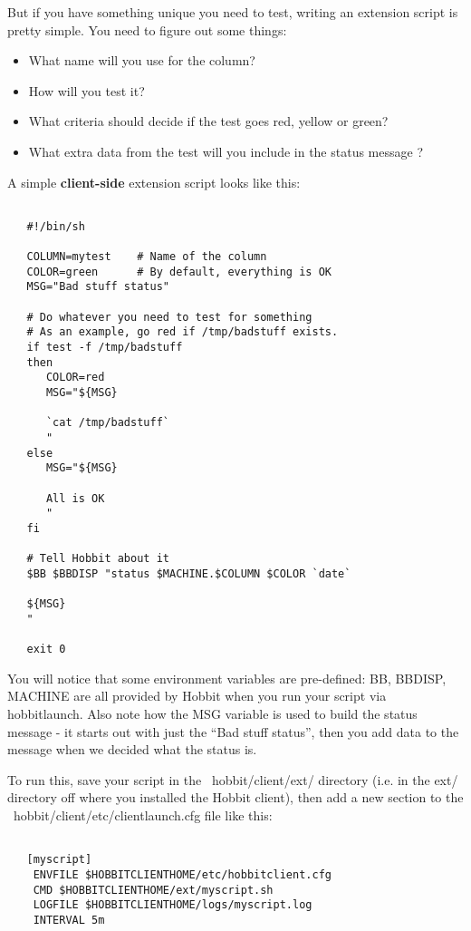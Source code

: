  But if you have something unique you need to test, writing an extension script is pretty simple. You need to figure out some things:
\begin{itemize}
\item What name will you use for the column? 
\item How will you test it? 
\item What criteria should decide if the test goes red, yellow or green? 
\item What extra data from the test will you include in the status message ? 

\end{itemize}


 A simple \textbf{client-side}
 extension script looks like this:
\begin{verbatim}

   #!/bin/sh

   COLUMN=mytest	# Name of the column
   COLOR=green		# By default, everything is OK
   MSG="Bad stuff status"

   # Do whatever you need to test for something
   # As an example, go red if /tmp/badstuff exists.
   if test -f /tmp/badstuff
   then
      COLOR=red
      MSG="${MSG}
 
      `cat /tmp/badstuff`
      "
   else
      MSG="${MSG}

      All is OK
      "
   fi

   # Tell Hobbit about it
   $BB $BBDISP "status $MACHINE.$COLUMN $COLOR `date`

   ${MSG}
   "

   exit 0

\end{verbatim}


 You will notice that some environment variables are pre-defined: BB, BBDISP, MACHINE are all provided by Hobbit when you run your script via hobbitlaunch. Also note how the MSG variable is used to build the status message - it starts out with just the ``Bad stuff status'', then you add data to the message when we decided what the status is.


 To run this, save your script in the ~hobbit/client/ext/ directory (i.e. in the ext/ directory off where you installed the Hobbit client), then add a new section to the ~hobbit/client/etc/clientlaunch.cfg file like this:
\begin{verbatim}

   [myscript]
	ENVFILE $HOBBITCLIENTHOME/etc/hobbitclient.cfg
	CMD $HOBBITCLIENTHOME/ext/myscript.sh
	LOGFILE $HOBBITCLIENTHOME/logs/myscript.log
	INTERVAL 5m

\end{verbatim}
\\ 
\\ 


